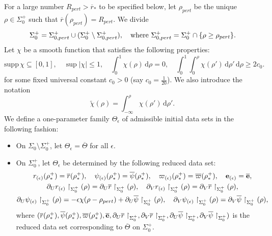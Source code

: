 \documentclass[10pt, reqno]{amsart}
\theoremstyle{definition}
\theoremstyle{remark}
\theoremstyle{conjecture}
\numberwithin{equation}{section}
\newcommand{\abs}[1]{\vert#1\vert}
\newcommand{\set}[1]{\{#1\}}
\newcommand{\ud}{\mathrm{d}}
\newcommand{\rd}{\partial}
\newcommand{\0}{\emptyset}
\newcommand{\eps}{\epsilon}
\newcommand{\Sgm}{\Sigma}
\newcommand{\Tht}{\Theta}
\newcommand{\bfe}{{\bf e}}
\newcommand{\e}{\bfe}							%
\newcommand{\psibg}{\overline{\psi}}				%
\newcommand{\rbg}{\overline{r}}					%
\newcommand{\varpibg}{\overline{\varpi}}				%
\newcommand{\ebg}{\overline{\e}}					%
\begin{document}
For a large number $R_{pert} > \rbg_*$ to be specified below, let $\rho_{pert}$ be the unique $\rho \in \Sgm_{0}^{+}$ such that $\rbg(\rho_{pert}) = R_{pert}$. We divide
\begin{equation*}
	\Sgm_{0}^{+} = \Sgm_{0, pert}^{+} \cup (\Sgm_{0}^{+} \setminus \Sgm_{0, pert}^{+}), \quad \hbox{where }
	\Sgm_{0, pert}^{+} = \Sgm_{0}^{+} \cap \set{\rho \geq \rho_{pert}}.
\end{equation*}
Let $\chi$ be a smooth function that satisfies the following properties:
\begin{equation} \label{eq:pert-chi}
	\mathrm{supp} \, \chi \subseteq [0, 1], \quad
	\sup \abs{\chi} \leq 1, \quad
	\int_{0}^{1} \chi(\rho) \, \ud \rho = 0 , \quad
	\int_{0}^{1} \int_{0}^{\rho} \chi(\rho') \, \ud \rho' \, \ud \rho\geq 2 c_{0}.
\end{equation}
for some fixed universal constant $c_{0} > 0$ (say $c_{0} = \frac{1}{20}$). We also introduce the notation 
\begin{equation*}
\tilde{\chi}(\rho) = \int_{-\infty}^{\rho} \chi(\rho') \, \ud \rho'.
\end{equation*}
We define a one-parameter family $\Tht_{\eps}$ of admissible initial data sets in the following fashion:
\begin{itemize}
\item On $\Sgm_{0} \setminus \Sgm_{0}^{+}$, let $\Tht_{\eps} = \overline{\Tht}$ for all $\eps$.
\item On $\Sgm_{0}^{+}$, let $\Tht_{\eps}$ be determined by the following reduced data set:
\begin{gather*}
	r_{(\eps)}(\rho^{+}_{\ast}) = \rbg(\rho^{+}_{\ast}), \quad
	\psi_{(\eps)}(\rho^{+}_{\ast}) = \psibg(\rho^{+}_{\ast}), \quad
	\varpi_{(\eps)}(\rho^{+}_{\ast}) = \varpibg(\rho^{+}_{\ast}), \quad
	\e_{(\eps)} = \ebg, \\
	\rd_{U} r_{(\eps)} \restriction_{\Sgm_{0}^{+}}(\rho) = \rd_{U} \rbg \restriction_{\Sgm_{0}^{+}}(\rho), \quad 
	\rd_{V} r_{(\eps)} \restriction_{\Sgm_{0}^{+}}(\rho) = \rd_{V} \rbg \restriction_{\Sgm_{0}^{+}}(\rho), \\
	\rd_{U} \psi_{(\eps)} \restriction_{\Sgm_{0}^{+}}(\rho) = - \eps \chi(\rho - \rho_{pert}) + \rd_{U} \psibg \restriction_{\Sgm_{0}^{+}}(\rho), \quad
	\rd_{V} \psi_{(\eps)} \restriction_{\Sgm_{0}^{+}}(\rho) = \rd_{V} \psibg \restriction_{\Sgm_{0}^{+}}(\rho),
\end{gather*}
where $(\rbg (\rho^{+}_{\ast}), \psibg (\rho^{+}_{\ast}), \varpibg(\rho^{+}_{\ast}), \ebg, \rd_{U} \rbg \restriction_{\Sgm_{0}^{+}}, \rd_{V} \rbg \restriction_{\Sgm_{0}^{+}}, \rd_{U} \psibg \restriction_{\Sgm_{0}^{+}}, \rd_{V} \psibg \restriction_{\Sgm_{0}^{+}})$ is the reduced data set corresponding to $\overline{\Tht}$ on $\Sgm_{0}^{+}$. 
\end{itemize}
\end{document}
